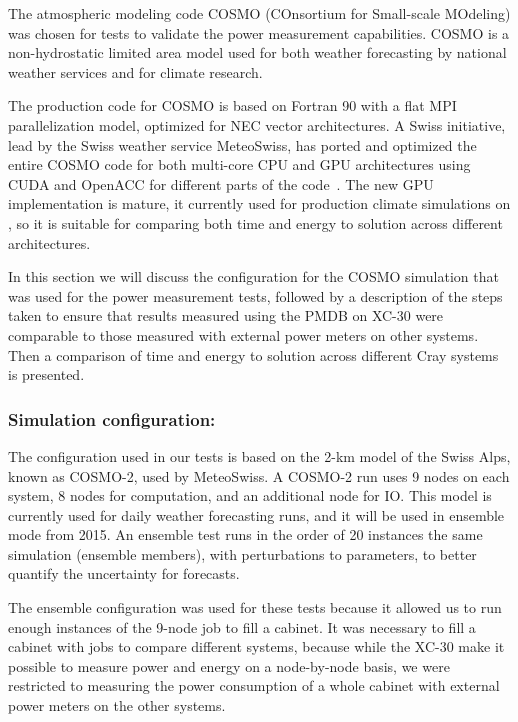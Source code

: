 The atmospheric modeling code COSMO (COnsortium for Small-scale MOdeling) was chosen for tests to validate the power measurement capabilities. COSMO is a non-hydrostatic limited area model used for both weather forecasting by national weather services and for climate research.

The production code for COSMO is based on Fortran 90 with a flat MPI parallelization model, optimized for NEC vector architectures.
A Swiss initiative, lead by the Swiss weather service MeteoSwiss, has ported and optimized the entire COSMO code for both multi-core CPU and GPU architectures using CUDA and OpenACC for different parts of the code~\cite{cug2013,gysi2014,cumming2014,lapillonne2014}.
The new GPU implementation is mature, it currently used for production climate simulations on \daint, so it is suitable for comparing both time and energy to solution across different architectures.

In this section we will discuss the configuration for the COSMO simulation that was used for the power measurement tests, followed by a description of the steps taken to ensure that results measured using the PMDB on XC-30 were comparable to those measured with external power meters on other systems. Then a comparison of time and energy to solution across different Cray systems is presented.

\subsubsection{Simulation configuration:}
The configuration used in our tests is based on the 2-km model of the Swiss Alps, known as COSMO-2, used by MeteoSwiss.
A COSMO-2 run uses 9 nodes on each system, 8 nodes for computation, and an additional node for IO.
This model is currently used for daily weather forecasting runs, and it will be used in ensemble mode from 2015.
An ensemble test runs in the order of 20 instances the same simulation (ensemble members), with perturbations to parameters, to better quantify the uncertainty for forecasts.

The ensemble configuration was used for these tests because it allowed us to run enough instances of the 9-node job to fill a cabinet.
It was necessary to fill a cabinet with jobs to compare different systems, because while the XC-30 make it possible to measure power and energy on a node-by-node basis, we were restricted to measuring the power consumption of a whole cabinet with external power meters on the other systems.






